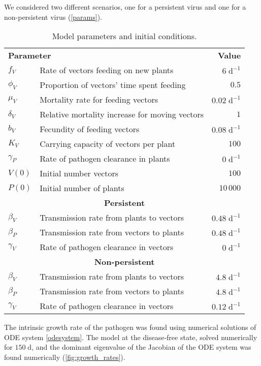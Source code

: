 \documentclass{article}
\begin{document}
We considered two different scenarios, one for a persistent virus and
one for a non-persistent virus (\autoref{params}).


\begin{table}
  \centering
  \begin{tabular}{llr}
    \multicolumn{2}{l}{\textbf{Parameter}}
    & \multicolumn{1}{r}{\textbf{Value}}
    \\
    $f_V$ & Rate of vectors feeding on new plants & $6\;\text{d}^{-1}$
    \\
    $\phi_V$ & Proportion of vectors' time spent feeding & $0.5$
    \\
    $\mu_V$ & Mortality rate for feeding vectors & $0.02\;\text{d}^{-1}$
    \\
    $\delta_V$ & Relative mortality increase for moving vectors & $1$
    \\
    $b_V$ & Fecundity of feeding vectors & $0.08\;\text{d}^{-1}$
    \\
    $K_V$ & Carrying capacity of vectors per plant & $100$
    \\
    $\gamma_P$ & Rate of pathogen clearance in plants & $0\;\text{d}^{-1}$
    \\
    $V(0)$ & Initial number vectors & $100$
    \\
    $P(0)$ & Initial number of plants & $10\,000$
    \\
    \multicolumn{3}{c}{\textbf{Persistent}}
    \\
    $\beta_V$ & Transmission rate from plants to vectors & $0.48\;\text{d}^{-1}$
    \\
    $\beta_P$ & Transmission rate from vectors to plants & $0.48\;\text{d}^{-1}$
    \\
    $\gamma_V$ & Rate of pathogen clearance in vectors & $0\;\text{d}^{-1}$
    \\
    \multicolumn{3}{c}{\textbf{Non-persistent}}
    \\
    $\beta_V$ & Transmission rate from plants to vectors & $4.8\;\text{d}^{-1}$
    \\
    $\beta_P$ & Transmission rate from vectors to plants & $4.8\;\text{d}^{-1}$
    \\
    $\gamma_V$ & Rate of pathogen clearance in vectors & $0.12\;\text{d}^{-1}$
  \end{tabular}
  \caption{Model parameters and initial conditions.}
  \label{params}
\end{table}


The intrinsic growth rate of the pathogen was found using numerical
solutions of ODE system \eqref{odesystem}.  The model at the
disease-free state, solved numerically for $150\;\mathrm{d}$, and the
dominant eigenvalue of the Jacobian of the ODE system was found
numerically (\autoref{fig:growth_rates}).
\end{document}
